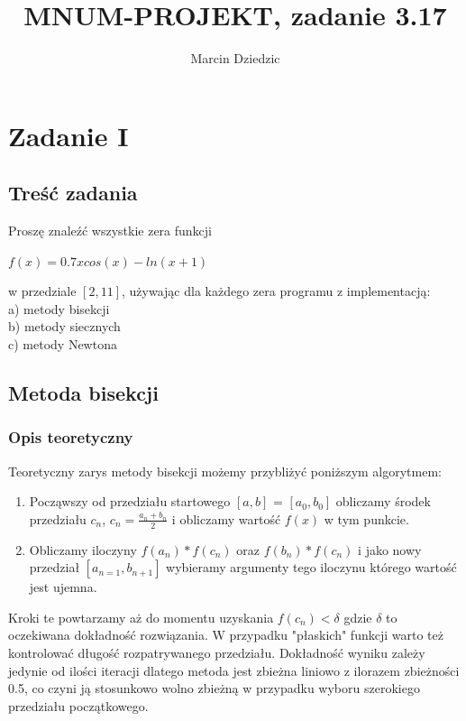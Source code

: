 \documentclass[11pt, oneside]{article}   	%
\title{MNUM-PROJEKT, zadanie 3.17}
\author{Marcin Dziedzic}
\begin{document}
\maketitle{}
\tableofcontents
\section{Zadanie I}
\subsection{Treść zadania}
Proszę znaleźć wszystkie zera funkcji
\begin{center}
$f(x) = 0.7xcos(x)-ln(x+1)$
\end{center}
w przedziale $[2,11]$, używając dla każdego zera programu z implementacją:\\
a) metody bisekcji\\
b) metody siecznych\\
c) metody Newtona\\


\subsection{Metoda bisekcji}
\subsubsection{Opis teoretyczny}
Teoretyczny zarys metody bisekcji możemy przybliżyć poniższym algorytmem:
\begin{enumerate}
  \item Począwszy od przedziału startowego $[a,b]$ = $[a_{0},b_{0}]$ obliczamy środek przedziału $c_{n}$,
  	$c_{n} = \frac{a_{n}+b_{n}}{2}$
  i obliczamy wartość $f(x)$ w tym punkcie. 
  \item Obliczamy iloczyny $f(a_{n})*f(c_{n})$ oraz $f(b_{n})*f(c_{n})$ i jako nowy przedział $[a_{n=1},b_{n+1}]$
  wybieramy argumenty tego iloczynu którego wartość jest ujemna. 
\end{enumerate} 
Kroki te powtarzamy aż do momentu uzyskania $f(c_{n})<\delta$ gdzie $\delta$ to oczekiwana dokładność rozwiązania. W przypadku "płaskich"  funkcji warto też kontrolować długość rozpatrywanego przedziału. 
Dokładność wyniku zależy jedynie od ilości iteracji dlatego metoda jest zbieżna liniowo z ilorazem zbieżności 0.5, co czyni ją stosunkowo wolno zbieżną w przypadku wyboru szerokiego przedziału początkowego. 
\end{document}
